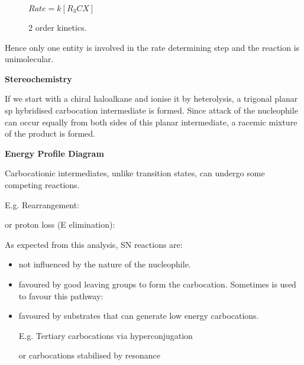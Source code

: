 \begin{figure}[H]
  \centering
  $Rate = k[R_3CX]$
  \caption*{2 order kinetics.}
\end{figure}

Hence only one entity is involved in the rate determining step and the reaction
is unimolecular.

\textbf{Stereochemistry}

If we start with a chiral haloalkane and ionise it by heterolysis, a trigonal
planar sp hybridised carbocation intermediate is formed. Since attack of
the nucleophile can occur equally from both sides of this planar intermediate, a
racemic mixture of the product is formed.


\textbf{Energy Profile Diagram}


Carbocationic intermediates, unlike transition states, can undergo some competing
reactions.

E.g. Rearrangement:


or proton loss (E elimination):


As expected from this analysis, SN reactions are:

\begin{itemize}
  \item not influenced by the nature of the nucleophile.
  \item favoured by good leaving groups to form the carbocation. Sometimes  is used to favour this pathway: 
  \item favoured by substrates that can generate low energy carbocations.

    E.g. Tertiary carbocations via hyperconjugation


    or carbocations stabilised by resonance


\end{itemize}
